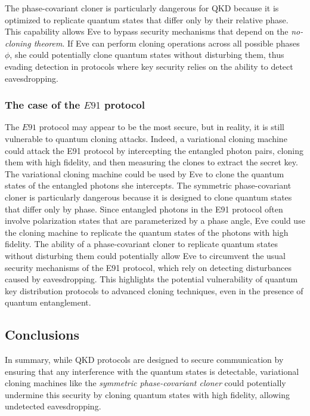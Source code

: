 \documentclass{article}
\theoremstyle{definition}
\theoremstyle{proposition}
\begin{document}
The phase-covariant cloner is particularly dangerous for QKD because it is optimized to replicate quantum states that differ only by their relative phase. This capability allows Eve to bypass security mechanisms that depend on the \textit{no-cloning theorem}. If Eve can perform cloning operations across all possible phases \( \phi \), she could potentially clone quantum states without disturbing them, thus evading detection in protocols where key security relies on the ability to detect eavesdropping.

\subsubsection*{The case of the $E91$ protocol}

The $E91$ protocol may appear to be the most secure, but in reality, it is still vulnerable to quantum cloning attacks. Indeed, a variational cloning machine could attack the E91 protocol by intercepting the entangled photon pairs, cloning them with high fidelity, and then measuring the clones to extract the secret key. The variational cloning machine could be used by Eve to clone the quantum states of the entangled photons she intercepts. The symmetric phase-covariant cloner is particularly dangerous because it is designed to clone quantum states that differ only by phase. Since entangled photons in the E91 protocol often involve polarization states that are parameterized by a phase angle, Eve could use the cloning machine to replicate the quantum states of the photons with high fidelity. The ability of a phase-covariant cloner to replicate quantum states without disturbing them could potentially allow Eve to circumvent the usual security mechanisms of the E91 protocol, which rely on detecting disturbances caused by eavesdropping. This highlights the potential vulnerability of quantum key distribution protocols to advanced cloning techniques, even in the presence of quantum entanglement.


\subsection*{Conclusions}

In summary, while QKD protocols are designed to secure communication by ensuring that any interference with the quantum states is detectable, variational cloning machines like the \textit{symmetric phase-covariant cloner} could potentially undermine this security by cloning quantum states with high fidelity, allowing undetected eavesdropping.
\end{document}
